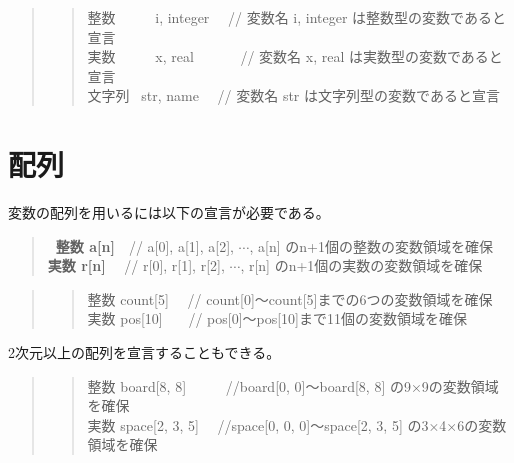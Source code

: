 \documentclass[11pt,a4j]{jarticle}
\begin{document}
\begin{quotation}
\noindent [使用例]
\begin{quotation}
\noindent 整数 \ \ \ \ \ i, integer \ \ // 変数名 i, integer は整数型の変数であると宣言 \\
実数 \ \ \ \ \ x, real \ \ \ \ \ \ // 変数名 x, real  は実数型の変数であると宣言\\
文字列 \ str, name \ \ // 変数名 str は文字列型の変数であると宣言
\end{quotation}
\end{quotation}

\section{配列}
変数の配列を用いるには以下の宣言が必要である。
\begin{quotation}
{\bf{
\noindent \ 整数 \hspace{0.5zw} a[n]}}\ \ // a[0], a[1], a[2], $\cdots$, a[n] のn+1個の整数の変数領域を確保\\
{\bf{
実数 \hspace{0.5zw} r[n]}} \ \ // r[0], r[1], r[2], $\cdots$, r[n] のn+1個の実数の変数領域を確保
\end{quotation}

\begin{quotation}
\noindent [配列の宣言例]
\begin{quotation}
\noindent 整数 \hspace{0.5zw} count[5] \ \ // count[0]〜count[5]までの6つの変数領域を確保 \\
実数 \hspace{0.5zw} pos[10] \ \ \ // pos[0]〜pos[10]まで11個の変数領域を確保
\end{quotation}
\end{quotation}

\noindent 2次元以上の配列を宣言することもできる。

\begin{quotation}
\noindent [宣言例]
\begin{quotation}
\noindent 整数 \hspace{0.5zw} board[8, 8] \ \ \ \ \ //board[0, 0]〜board[8, 8] の9×9の変数領域を確保 \\
実数 \hspace{0.5zw} space[2, 3, 5] \ \ //space[0, 0, 0]〜space[2, 3, 5] の3×4×6の変数領域を確保 \\
\end{quotation}
\end{quotation}
\end{document}
